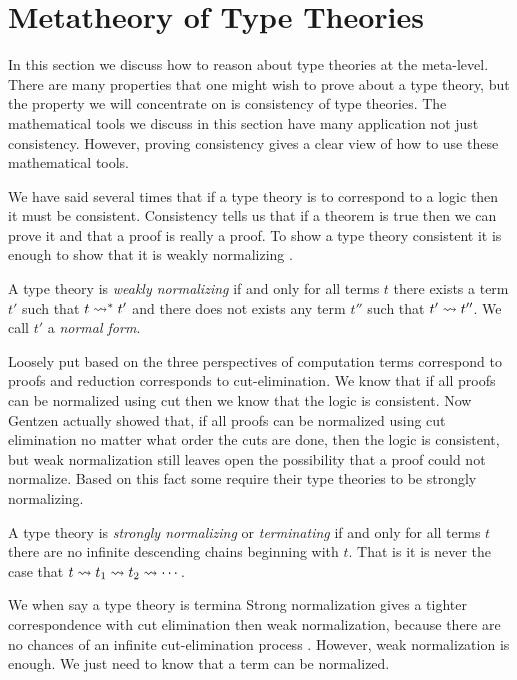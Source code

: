 \documentclass{article}
\begin{document}
\section{Metatheory of Type Theories}
\label{sec:metatheory_of_programming_languages}
In this section we discuss how to reason about type theories at the
meta-level.  There are many properties that one might wish to prove
about a type theory, but the property we will concentrate on is
consistency of type theories.  The mathematical tools we discuss in
this section have many application not just consistency.  However,
proving consistency gives a clear view of how to use these
mathematical tools.

We have said several times that if a type theory is to correspond to a
logic then it must be consistent.  Consistency tells us that if a
theorem is true then we can prove it and that a proof is really a
proof.  To show a type theory consistent it is enough to show that it
is weakly normalizing \cite{Sorensen:2006}.
\begin{definition}
  \label{def:weak_norm}
  A type theory is \emph{weakly normalizing} if and only for all terms $t$
  there exists a term $t'$ such that $t \rightsquigarrow^* t'$ and there does
  not exists any term $t''$ such that $t' \rightsquigarrow t''$.  We
  call $t'$ a \emph{normal form}.
\end{definition}
\noindent
Loosely put based on the three perspectives of computation terms
correspond to proofs and reduction corresponds to cut-elimination.  We
know that if all proofs can be normalized using cut then we know that
the logic is consistent.  Now Gentzen actually showed that, if all
proofs can be normalized using cut elimination no matter what order
the cuts are done, then the logic is consistent, but weak normalization
still leaves open the possibility that a proof could not
normalize. Based on this fact some require their type theories to be
strongly normalizing.  
\begin{definition}
  \label{def:strong_norm}
  A type theory is \emph{strongly normalizing} or \emph{terminating}
  if and only for all terms $t$ there are no infinite descending
  chains beginning with $t$.  That is it is never the case that $t
  \rightsquigarrow t_1 \rightsquigarrow t_2 \rightsquigarrow \cdots$.
\end{definition}
\noindent
We when say a type theory is termina Strong normalization gives a
tighter correspondence with cut elimination then weak normalization,
because there are no chances of an infinite cut-elimination process
\cite{Sorensen:2006}.  However, weak normalization is enough.  We just
need to know that a term can be normalized. 
\end{document}

